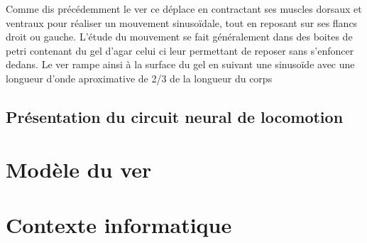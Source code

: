 Comme dis précédemment le ver ce déplace en contractant ses muscles dorsaux
et ventraux pour réaliser un mouvement sinusoïdale, tout en reposant sur
ses flancs droit ou gauche. L'étude du mouvement se fait généralement 
dans des boites de petri contenant du gel d'agar celui ci leur permettant de
reposer sans s'enfoncer dedans. Le ver rampe ainsi à la surface du gel en suivant
une sinusoïde avec une longueur d'onde aproximative de 2/3 de la longueur du corps
\cite{Boyle2009}


\subsection{Présentation du circuit neural de locomotion} %
\label{sub:Présentation du circuit neural de locomotion}



\section{Modèle du ver} %
\label{sec:Modèle du ver}


\section{Contexte informatique} %
\label{sec:Contexte informatique}


